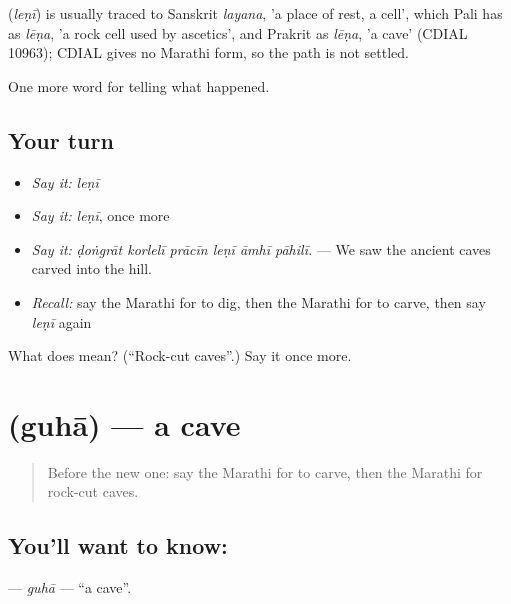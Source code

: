 \begin{cousinweb}
\textbf{} (\emph{leṇī}) is usually traced to Sanskrit \emph{layana}, 'a place of rest, a cell', which Pali has as \emph{lēṇa}, 'a rock cell used by ascetics', and Prakrit as \emph{lēṇa}, 'a cave' (CDIAL 10963); CDIAL gives no Marathi form, so the path is not settled.
\end{cousinweb}

\begin{grammarlens}[title={What you've built}]
One more word for telling what happened.
\end{grammarlens}

\subsection*{Your turn}
\begin{itemize}
\raggedright
  \item \emph{Say it:} \emph{leṇī}
  \item \emph{Say it:} \emph{leṇī}, once more
  \item \emph{Say it:} \emph{ḍoṅgrāt korlelī prācīn leṇī āmhī pāhilī.} — We saw the ancient caves carved into the hill.
  \item \emph{Recall:} say the Marathi for to dig, then the Marathi for to carve, then say \emph{leṇī} again
\end{itemize}

\begin{tcolorbox}[breakable,colback=teal!4,colframe=teal!35!black,title={Before you move on}]
What does  mean? (\textquotedblleft{}Rock-cut caves\textquotedblright{}.) Say it once more.
\end{tcolorbox}
\section[\texorpdfstring{\mr{गुहा} (guhā)}{गुहा (guhā)}]{ (guhā) — a cave}

\label{lesson:MR-C336-guha}



\begin{quote}
Before the new one: say the Marathi for to carve, then the Marathi for rock-cut caves.
\end{quote}

\subsection*{You'll want to know: }
\textbf{} — \emph{guhā} — \textquotedblleft{}a cave\textquotedblright{}.

